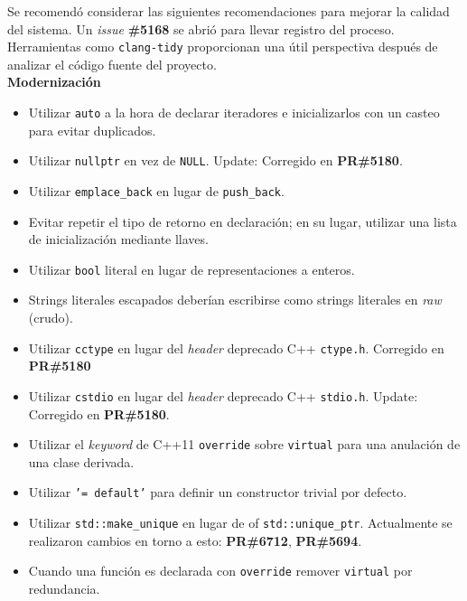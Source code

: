 Se recomendó considerar las siguientes recomendaciones para mejorar la calidad del sistema. Un \textit{issue} \textbf{\#5168}\cite{GHI5168} se abrió para llevar registro del proceso. Herramientas como \texttt{clang-tidy} proporcionan una útil perspectiva después de analizar el código fuente del proyecto.\\

\textbf{Modernización}
\begin{itemize}
  \item Utilizar \texttt{auto} a la hora de declarar iteradores e inicializarlos con un casteo para evitar duplicados.
  \item Utilizar \texttt{nullptr} en vez de \texttt{NULL}. Update: Corregido en \textbf{PR\#5180}\cite{GHPR5180}.
  \item Utilizar \texttt{emplace\_back} en lugar de \texttt{push\_back}.
  \item Evitar repetir el tipo de retorno en declaración; en su lugar, utilizar una lista de inicialización mediante llaves.
  \item Utilizar \texttt{bool} literal en lugar de representaciones a enteros.
  \item Strings literales escapados deberían escribirse como strings literales en \textit{raw} (crudo).
  \item Utilizar \texttt{cctype} en lugar del \textit{header} deprecado C++ \texttt{ctype.h}. Corregido en \textbf{PR\#5180}\cite{GHPR5180}
  \item Utilizar \texttt{cstdio} en lugar del \textit{header} deprecado C++ \texttt{stdio.h}. Update: Corregido en \textbf{PR\#5180}\cite{GHPR5180}.
  \item Utilizar el \textit{keyword} de C++11 \texttt{override} sobre \texttt{virtual} para una anulación de una clase derivada.
  \item Utilizar \texttt{'= default'} para definir un constructor trivial por defecto.
  \item Utilizar \texttt{std::make\_unique} en lugar de of \texttt{std::unique\_ptr}. Actualmente se realizaron cambios en torno a esto: \textbf{PR\#6712}\cite{GHPR6712}, \textbf{PR\#5694}\cite{GHPR5694}.
  \item Cuando una función es declarada con \texttt{override} remover \texttt{virtual} por redundancia.\\
\end{itemize}

